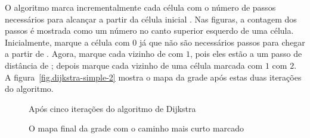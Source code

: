 {%

O algoritmo marca incrementalmente cada célula  com o número de passos necessários para alcançar  a partir da célula inicial . Nas figuras, a contagem dos passos é mostrada como um número no canto superior esquerdo de uma célula. Inicialmente, marque a célula  com $0$ já que não são necessários passos para chegar  a partir de . Agora, marque cada vizinho de  com $1$, pois eles estão a um passo de distância de ; depois marque cada vizinho de uma célula marcada com $1$ com $2$. A figura~\ref{fig.dijkstra-simple-2} mostra o mapa da grade após estas duas iterações do algoritmo.

\begin{figure}
\begin{minipage}{.5\textwidth}
\caption{Após cinco iterações do algoritmo de Dijkstra}
\label{fig.dijkstra-simple-5}
\end{minipage}
\hspace{\fill}
\begin{minipage}{.5\textwidth}
\caption{O mapa final da grade com o caminho mais curto marcado}
\label{fig.dijkstra-simple-9}
\end{minipage}
\end{figure}

}
